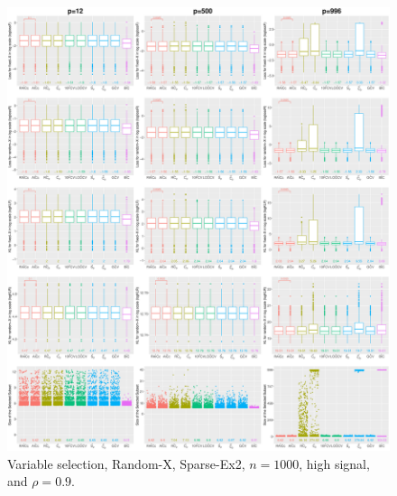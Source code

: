 \begin{figure}[!ht]
\centering
\includegraphics[width=\textwidth]{figures/supplement/randomx/subset_selection/Sparse-Ex2_n1000_hsnr_rho09.eps}
\caption{Variable selection, Random-X, Sparse-Ex2, $n=1000$, high signal, and $\rho=0.9$.}
\end{figure}
\clearpage
